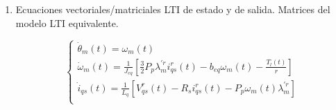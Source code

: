 \documentclass{article}
\begin{document}
\begin{enumerate}[label=\roman*.]
    \item Ecuaciones vectoriales/matriciales LTI de estado y de salida. 
    Matrices del modelo LTI equivalente.

    \begin{equation}
        \begin{cases}
            \dot{\theta}_{m}(t) = \omega_{m}(t)\\
            \dot{\omega}_{m}(t) = \frac{1}{J_{eq}}[\frac{3}{2}P_{p}\lambda_{m}^{\prime r}i_{qs}^r(t) - b_{eq}\omega_{m}(t) - \frac{T_{l}(t)}{r}]\\
            \dot{i}_{qs}(t) = \frac{1}{L_{q}}[V_{qs}^r(t) - R_{s}i_{qs}^r(t) - P_{p}\omega_{m}(t)\lambda_{m}^{\prime r}]  \\
        \end{cases}
    \end{equation}


\end{enumerate}
\end{document}
